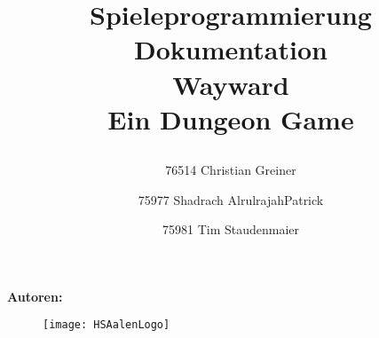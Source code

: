 


\title{\begin{center}\fontsize{40bp}{40bp}\selectfont\color{DarkBlue}
Spieleprogrammierung Dokumentation \\ [20pt]
\color{black}
\fontsize{16bp}{16bp}\selectfont
\fontsize{30bp}{30bp}\selectfont
\color{LightBlue}
Wayward\\
\fontsize{10bp}{10bp}\selectfont
\color{black}
\bigskip
Ein Dungeon Game
\end{center}
}
\maketitle

\date{}
\begin{center}
\textbf{\fontsize{12bp}{12bp}\selectfont
Autoren:\\}
\bigskip
\author{ 76514 Christian Greiner\\
\and 75977 Shadrach AlrulrajahPatrick\\
\and 75981 Tim Staudenmaier
}
\end{center}
\begin{figure}
\centering
\texttt{[image: HSAalenLogo]}
\end{figure}

\newpage
			

\setcounter{page}{1} %

{\hypersetup{linkcolor=black}
\tableofcontents
}
\newpage